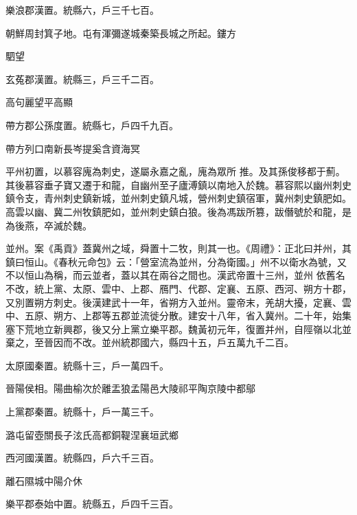 \begin{pinyinscope}
 樂浪郡漢置。統縣六，戶三千七百。



 朝鮮周封箕子地。屯有渾彌遂城秦築長城之所起。鏤方



 駟望



 玄菟郡漢置。統縣三，戶三千二百。



 高句麗望平高顯



 帶方郡公孫度置。統縣七，戶四千九百。



 帶方列口南新長岑提奚含資海冥



 平州初置，以慕容廆為刺史，遂屬永嘉之亂，廆為眾所
 推。及其孫俊移都于薊。其後慕容垂子寶又遷于和龍，自幽州至子廬溥鎮以南地入於魏。慕容熙以幽州刺史鎮令支，青州刺史鎮新城，並州刺史鎮凡城，營州刺史鎮宿軍，冀州刺史鎮肥如。高雲以幽、冀二州牧鎮肥如，並州刺史鎮白狼。後為馮跋所篡，跋僭號於和龍，是為後燕，卒滅於魏。



 並州。案《禹貢》蓋冀州之域，舜置十二牧，則其一也。《周禮》：正北曰并州，其鎮曰恒山。《春秋元命包》云：「營室流為並州，分為衛國。」州不以衛水為號，又不以恒山為稱，而云並者，蓋以其在兩谷之間也。漢武帝置十三州，並州
 依舊名不改，統上黨、太原、雲中、上郡、鴈門、代郡、定襄、五原、西河、朔方十郡，又別置朔方刺史。後漢建武十一年，省朔方入並州。靈帝末，羌胡大擾，定襄、雲中、五原、朔方、上郡等五郡並流徙分散。建安十八年，省入冀州。二十年，始集塞下荒地立新興郡，後又分上黨立樂平郡。魏黃初元年，復置并州，自陘嶺以北並棄之，至晉因而不改。並州統郡國六，縣四十五，戶五萬九千二百。



 太原國秦置。統縣十三，戶一萬四千。



 晉陽侯相。陽曲榆次於離盂狼孟陽邑大陵祁平陶京陵中都鄔



 上黨郡秦置。統縣十，戶一萬三千。



 潞屯留壺關長子泫氏高都銅鞮涅襄垣武鄉



 西河國漢置。統縣四，戶六千三百。



 離石隰城中陽介休



 樂平郡泰始中置。統縣五，戶四千三百。




\end{pinyinscope}

